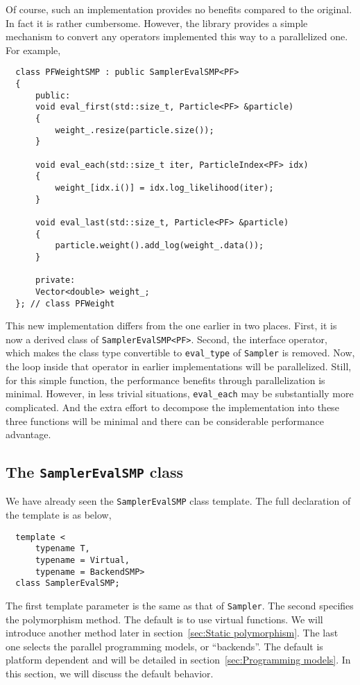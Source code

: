 Of course, such an implementation provides no benefits compared to the
original. In fact it is rather cumbersome. However, the library provides a
simple mechanism to convert any operators implemented this way to a
parallelized one. For example,
\begin{Verbatim}
  class PFWeightSMP : public SamplerEvalSMP<PF>
  {
      public:
      void eval_first(std::size_t, Particle<PF> &particle)
      {
          weight_.resize(particle.size());
      }

      void eval_each(std::size_t iter, ParticleIndex<PF> idx)
      {
          weight_[idx.i()] = idx.log_likelihood(iter);
      }

      void eval_last(std::size_t, Particle<PF> &particle)
      {
          particle.weight().add_log(weight_.data());
      }

      private:
      Vector<double> weight_;
  }; // class PFWeight
\end{Verbatim}
This new implementation differs from the one earlier in two places. First, it
is now a derived class of \verb|SamplerEvalSMP<PF>|. Second, the interface
operator, which makes the class type convertible to \verb|eval_type| of
\verb|Sampler| is removed. Now, the loop inside that operator in earlier
implementations will be parallelized. Still, for this simple function, the
performance benefits through parallelization is minimal. However, in less
trivial situations, \verb|eval_each| may be substantially more complicated. And
the extra effort to decompose the implementation into these three functions
will be minimal and there can be considerable performance advantage.

\subsection{The \texttt{SamplerEvalSMP} class}
\label{sub:The SamplerEvalSMP class}

We have already seen the \verb|SamplerEvalSMP| class template. The full
declaration of the template is as below,
\begin{Verbatim}
  template <
      typename T,
      typename = Virtual,
      typename = BackendSMP>
  class SamplerEvalSMP;
\end{Verbatim}
The first template parameter is the same as that of \verb|Sampler|. The second
specifies the polymorphism method. The default is to use virtual functions. We
will introduce another method later in section~\ref{sec:Static polymorphism}.
The last one selects the parallel programming models, or ``backends''. The
default is platform dependent and will be detailed in
section~\ref{sec:Programming models}. In this section, we will discuss the
default behavior.


